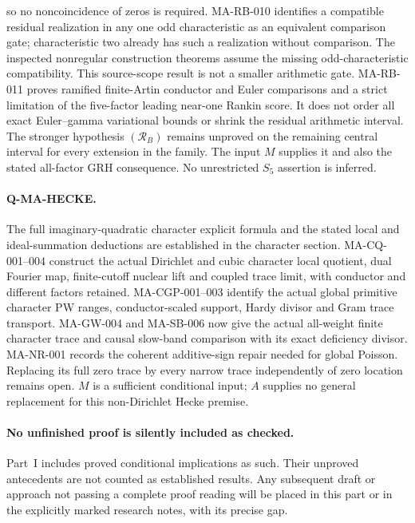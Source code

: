 \documentclass[11pt,a4paper]{article}
\begin{document}
so no noncoincidence of zeros is required.
MA-RB-010 identifies a compatible residual realization in
any one odd characteristic as an equivalent comparison gate;
characteristic two already has such a realization without
comparison. The inspected nonregular construction theorems
assume the missing odd-characteristic compatibility. This
source-scope result is not a smaller arithmetic gate.
MA-RB-011 proves ramified finite-Artin conductor and Euler
comparisons and a strict limitation of the five-factor leading
near-one Rankin score. It does not order all exact Euler--gamma
variational bounds or shrink the residual arithmetic interval.
The stronger hypothesis $(\mathcal R_B)$ remains unproved on
the remaining central interval for every extension in the family.
The input $M$ supplies it and also the stated all-factor GRH
consequence. No unrestricted $S_5$ assertion is inferred.

\paragraph{Q-MA-HECKE.}
The full imaginary-quadratic character explicit formula and
the stated local and ideal-summation deductions are established
in the character section. MA-CQ-001--004 construct the actual
Dirichlet and cubic character local quotient, dual Fourier map,
finite-cutoff nuclear lift and coupled trace limit, with
conductor and different factors retained. MA-CGP-001--003
identify the actual global primitive character PW ranges,
conductor-scaled support, Hardy divisor and Gram trace transport.
MA-GW-004 and MA-SB-006 now give the actual all-weight finite
character trace and causal slow-band comparison with its exact
deficiency divisor. MA-NR-001 records the coherent additive-sign
repair needed for global Poisson. Replacing its full zero trace by every
narrow trace independently of zero location remains open.
$M$ is a sufficient conditional input; $A$ supplies no general
replacement for this non-Dirichlet Hecke premise.

\paragraph{No unfinished proof is silently included as checked.}
Part~I includes proved conditional implications as such. Their
unproved antecedents are not counted as established results.
Any subsequent draft or approach not passing a complete proof
reading will be placed in this part or in the explicitly marked
research notes, with its precise gap.
\end{document}
